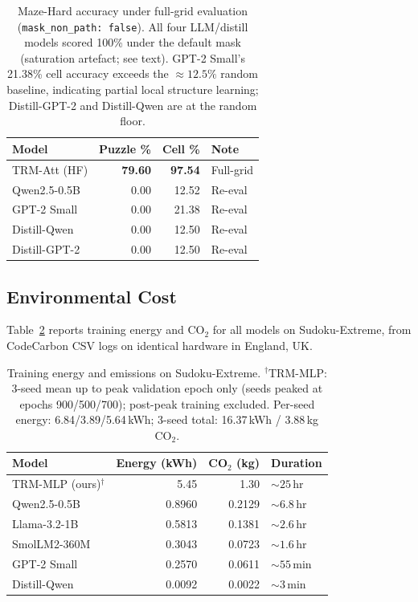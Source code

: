 \documentclass{article}
\begin{document}
\begin{table}[t]
\centering
\small
\begin{tabular}{lrrl}
\toprule
\textbf{Model} & \textbf{Puzzle \%} & \textbf{Cell \%} & \textbf{Note} \\
\midrule
TRM-Att (HF)         & \textbf{79.60} & \textbf{97.54} & Full-grid \\
Qwen2.5-0.5B         & 0.00           & 12.52          & Re-eval \\
GPT-2 Small          & 0.00           & 21.38          & Re-eval \\
Distill-Qwen         & 0.00           & 12.50          & Re-eval \\
Distill-GPT-2        & 0.00           & 12.50          & Re-eval \\
\bottomrule
\end{tabular}
\caption{Maze-Hard accuracy under full-grid evaluation (\texttt{mask\_non\_path: false}). All four LLM/distill models scored 100\% under the default mask (saturation artefact; see text). GPT-2 Small's 21.38\% cell accuracy exceeds the ${\approx}12.5\%$ random baseline, indicating partial local structure learning; Distill-GPT-2 and Distill-Qwen are at the random floor.}
\label{tab:maze}
\end{table}

\subsection{Environmental Cost}
\label{sec:training_cost}

Table~\ref{tab:energy} reports training energy and CO$_2$ for all models on Sudoku-Extreme, from CodeCarbon CSV logs on identical hardware in England, UK.

\begin{table}[t]
\centering
\small
\begin{tabular}{lrrl}
\toprule
\textbf{Model} & \textbf{Energy (kWh)} & \textbf{CO$_2$ (kg)} & \textbf{Duration} \\
\midrule
TRM-MLP (ours)$^{\dagger}$ & 5.45  & 1.30   & ${\sim}25\,\text{hr}$    \\
Qwen2.5-0.5B  & 0.8960 & 0.2129 & ${\sim}6.8\,\text{hr}$  \\
Llama-3.2-1B  & 0.5813 & 0.1381 & ${\sim}2.6\,\text{hr}$  \\
SmolLM2-360M  & 0.3043 & 0.0723 & ${\sim}1.6\,\text{hr}$  \\
GPT-2 Small   & 0.2570 & 0.0611 & ${\sim}55\,\text{min}$  \\
Distill-Qwen  & 0.0092 & 0.0022 & ${\sim}3\,\text{min}$   \\
\bottomrule
\end{tabular}
\caption{Training energy and emissions on Sudoku-Extreme. $^{\dagger}$TRM-MLP: 3-seed mean up to peak validation epoch only (seeds peaked at epochs 900/500/700); post-peak training excluded. Per-seed energy: 6.84/3.89/5.64\,kWh; 3-seed total: 16.37\,kWh / 3.88\,kg CO$_2$.}
\label{tab:energy}
\end{table}
\end{document}
